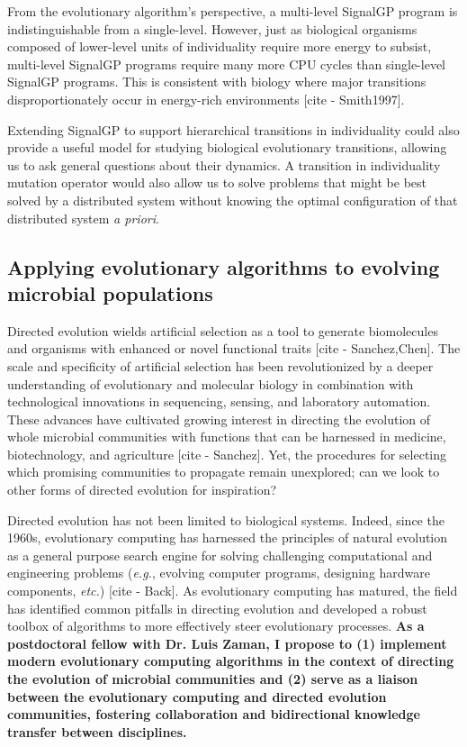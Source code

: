 From the evolutionary algorithm's perspective, a multi-level SignalGP program is indistinguishable from a single-level. 
However, just as biological organisms composed of lower-level units of individuality require more energy to subsist, multi-level SignalGP programs require many more CPU cycles than single-level SignalGP programs. 
This is consistent with biology where major transitions disproportionately occur in energy-rich environments [cite - Smith1997]. 

Extending SignalGP to support hierarchical transitions in individuality could also provide a useful model for studying biological evolutionary transitions, allowing us to ask general questions about their dynamics. 
A transition in individuality mutation operator would also allow us to solve problems that might be best solved by a distributed system without knowing the optimal configuration of that distributed system \textit{a priori}. 

\subsection{Applying evolutionary algorithms to evolving microbial populations}

Directed evolution wields artificial selection as a tool to generate biomolecules and organisms with enhanced or novel functional traits [cite - Sanchez,Chen].
The scale and specificity of artificial selection has been revolutionized by a deeper understanding of evolutionary and molecular biology in combination with technological innovations in sequencing, sensing, and laboratory automation.
These advances have cultivated growing interest in directing the evolution of whole microbial communities with functions that can be harnessed in medicine, biotechnology, and agriculture [cite - Sanchez]. 
Yet, the procedures for selecting which promising communities to propagate remain unexplored; can we look to other forms of directed evolution for inspiration?

Directed evolution has not been limited to biological systems. 
Indeed, since the 1960s, evolutionary computing has harnessed the principles of natural evolution as a general purpose search engine for solving challenging computational and engineering problems (\textit{e.g.}, evolving computer programs, designing hardware components, \textit{etc.}) [cite - Back]. 
As evolutionary computing has matured, the field has identified common pitfalls in directing evolution and developed a robust toolbox of algorithms to more effectively steer evolutionary processes.
\textbf{As a postdoctoral fellow with Dr. Luis Zaman, I propose to
(1) implement modern evolutionary computing algorithms in the context of directing the evolution of microbial communities
and (2) serve as a liaison between the evolutionary computing and directed evolution communities, fostering collaboration and bidirectional knowledge transfer between disciplines.}

